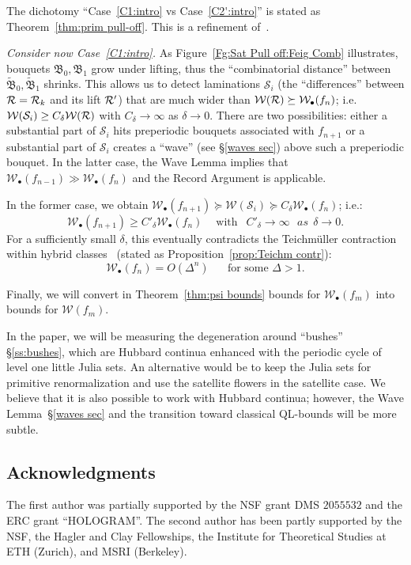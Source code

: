 \documentclass{amsart}
\newcommand{\bush}{{\mathfrak B }}
\renewcommand{\sp}{{\ \ }}
\newcommand{\1}{{\mathbb 1 }}
\newcommand{\FamS}{{\mathcal S}}
\newcommand{\Width}{{\mathcal W}}
\begin{document}
The dichotomy ``Case~\ref{C1:intro} vs Case~\ref{C2':intro}'' is stated as Theorem~\ref{thm:prim pull-off}. This is a refinement of~\cite{K}.





\emph{Consider now Case~\ref{C1:intro}.} As Figure~\ref{Fg:Sat Pull
  off:Feig Comb} illustrates, bouquets $\bush_0,\bush_1$ grow under
lifting, thus the ``combinatorial distance'' between $\widetilde
\bush_0,\widetilde \bush_1$ shrinks. This allows us to detect
laminations $\FamS_i$ (the ``differences'' between ${\mathcal R}={\mathcal R}_k$ and its
lift ${\mathcal R}'$) that are much wider than $\Width(\RR)\succeq
\Width_\bullet(f_n)$; i.e.~$\Width(\FamS_i)\ge C_\delta \Width(\RR)$
with $C_\delta\to \infty$ as $\delta\to 0$. There are two
possibilities: either a substantial part of $\FamS_i$ hits preperiodic
bouquets associated with $f_{n+1}$ or a substantial part of $\FamS_i$
creates a ``wave'' (see \S \ref{waves sec})  above such a preperiodic
bouquet. In the latter case, the Wave Lemma implies that
$\Width_\bullet(f_{n-1}) \gg \Width_\bullet(f_n)$
and the Record Argument is applicable.

In the former case, we obtain $\Width_\bullet (f_{n+1}) \succeq \Width(\FamS_i) \succeq C_\delta \Width_\bullet(f_n)$; i.e.:
\[\Width_\bullet (f_{n+1}) \ge C'_\delta \Width_\bullet(f_n)\sp\sp\text{ with }\sp C'_\delta\to \infty\text\sp { as }\sp \delta\to 0.\]
 For a sufficiently small $\delta$, this eventually contradicts the Teichm\"uller contraction within hybrid classes~\cite{S:Berkeley} (stated as Proposition~\ref{prop:Teichm contr}):  
\[ \Width_\bullet (f_n) = O\left( \Delta^n\right) \sp\sp\sp\text{ for some } \Delta >1.\]

  
Finally, we will convert in Theorem~\ref{thm:psi bounds} bounds for $\Width_\bullet(f_m)$ into bounds for $\Width(f_m)$.


\begin{rem} In the paper, we will be measuring the degeneration around ``bushes'' \S\ref{ss:bushes}, which are Hubbard continua enhanced with the periodic cycle of level one little Julia sets. An alternative would be to keep the Julia sets for primitive renormalization and use the satellite flowers in the satellite case. We believe that it is also possible to work with Hubbard continua; however, the Wave Lemma~\S\ref{waves sec} and the transition toward classical QL-bounds will be more subtle.
\end{rem}

\subsection*{Acknowledgments}
The first author was partially supported by the NSF grant DMS $2055532$ and the ERC grant ``HOLOGRAM''. The second author has been partly supported by the NSF, the Hagler and Clay Fellowships, the Institute for Theoretical Studies at ETH (Zurich), and MSRI (Berkeley).
\end{document}
